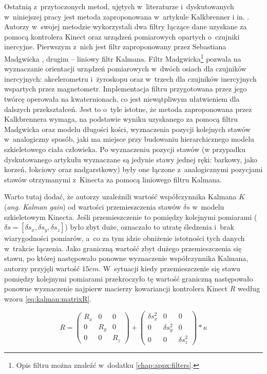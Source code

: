 Ostatnią z~przytoczonych metod, ujętych w~literaturze i~dyskutowanych w~niniejszej pracy jest metoda zaproponowana w~artykule Kalkbrenner i in. \cite{Kalkbrenner2014}. Autorzy w~swojej metodzie wykorzystali dwa filtry łączące dane uzyskane za pomocą kontrolera Kinect oraz urządzeń pomiarowych opartych o~czujniki inercyjne. Pierwszym z~nich jest filtr zaproponowany przez Sebastiana Madgwicka \cite{Kalkbrenner2014}, drugim -- liniowy filtr Kalmana. Filtr Madgwicka\footnote{Opis filtru można znaleźć w~dodatku \ref{chap:appx:filters}.} pozwala na wyznaczanie orientacji urządzeń pomiarowych w~dwóch osiach dla czujników inercyjnych: akcelerometru i~żyroskopu oraz w~trzech dla czujników inercyjnych wspartych przez magnetometr. Implementacja filtru przygotowana przez jego twórcę operowała na kwaternionach, co jest niewątpliwym ułatwieniem dla dalszych przekształceń. Jest to o~tyle istotne, że metoda zaproponowana przez Kalkbrennera wymaga, na podstawie wyniku uzyskanego za pomocą filtru Madgwicka oraz modelu długości kości, wyznaczenia pozycji kolejnych stawów  w~analogiczny sposób, jaki ma miejsce przy budowaniu hierarchicznego modelu szkieletowego ciała człowieka. Po wyznaczeniu pozycji stawów (w przypadku dyskutowanego artykułu wyznaczane są jedynie stawy jednej ręki: barkowy, jako korzeń, łokciowy oraz nadgarstkowy) były one łączone z~analogicznymi pozycjami stawów otrzymanymi z~Kinecta za pomocą liniowego filtru Kalmana.							
				
Warto tutaj dodać, że autorzy uzależnili wartość współczynnika Kalmana $K$ (\emph{ang. Kalman gain}) od wartości przemieszczenia stawów $\delta s$ w~modelu szkieletowym Kinecta. Jeśli przemieszczenie to pomiędzy kolejnymi pomiarami ($\delta s = [\delta s_x, \delta s_y, \delta s_z]$) było zbyt duże, oznaczało to utratę śledzenia i~brak wiarygodności pomiarów, a~co za tym idzie obniżenie istotności tych danych w~trakcie łączenia. Jako graniczną wartość zbyt dużego przemieszczenia się stawu, po której następowało ponowne wyznaczenie współczynnika Kalmana, autorzy przyjęli wartość $15cm$. W~sytuacji kiedy przemieszczenie się stawu pomiędzy kolejnymi pomiarami przekroczyło tę wartość graniczną następowało ponowne wyznaczenie najpierw macierzy kowariancji kontrolera Kinect $R$ według wzoru \ref{eq:kalman:matrixR}.
									
\begin{equation}
	R = 
	\begin{pmatrix}
		R_x & 0   & 0   \\
		0   & R_y & 0   \\
		0   & 0   & R_z 
	\end{pmatrix} +
	\begin{pmatrix}
		\delta s_x^2 & 0            & 0            \\
		0            & \delta s_y^2 & 0            \\
		0            & 0            & \delta s_z^2 
	\end{pmatrix} * \kappa
	\label{eq:kalman:matrixR}
\end{equation}

